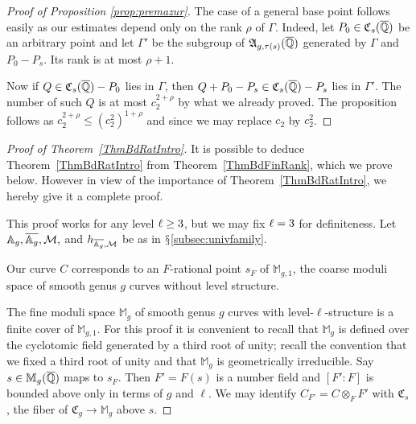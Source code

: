 \begin{proof}[Proof of Proposition \ref{prop:premazur}]
  The case of a general base point follows easily as our estimates
  depend only on the rank $\rho$ of $\Gamma$. Indeed,
  let $P_0\in \mathfrak{C}_s({\overline{\mathbb{Q}}})$ be an arbitrary point and let
  $\Gamma'$ be the subgroup of $\mathfrak{A}_{g,\tau(s)}({\overline{\mathbb{Q}}})$ generated by
  $\Gamma$ and $P_0-P_s$. Its rank is at most $\rho +1$.

  Now if $Q\in \mathfrak{C}_s({\overline{\mathbb{Q}}})-P_0$ lies in $\Gamma$, then
  $Q+P_0-P_s\in \mathfrak{C}_s({\overline{\mathbb{Q}}})-P_s$ lies in $\Gamma'$. The
  number of such $Q$ is at most $c_2^{2+\rho}$ by
  what we already proved. 
  The proposition follows as $c_2^{2+\rho}\le (c_2^2)^{1+\rho}$ and
  since we may replace $c_2$ by $c_2^2$. 
\end{proof}




\begin{proof}[Proof of Theorem~\ref{ThmBdRatIntro}] 
  It is possible to deduce Theorem~\ref{ThmBdRatIntro} from
  Theorem~\ref{ThmBdFinRank}, which we prove below. However in view of
  the importance of Theorem~\ref{ThmBdRatIntro}, we hereby give it a
  complete proof.

  This proof works for any level $\ell\ge3$, but we may fix
  $\ell=3$ for definiteness. Let
  $\mathbb{A}_g,\overline{\mathbb{A}_g},{\mathcal M},$
  and $h_{\overline{\mathbb{A}_g},{\mathcal M}}$ be as in $\mathsection$\ref{subsec:univfamily}.

  
  Our curve $C$ corresponds to an $F$-rational point $s_F$ of $\mathbb{M}_{g,1}$, the coarse
  moduli space of smooth genus $g$ curves without level structure. 

  
  The fine moduli space $\mathbb{M}_g$ of smooth genus $g$ curves
  with level-$\ell$-structure is a finite cover of $\mathbb{M}_{g,1}$.
  For this proof it is convenient to recall that 
  $\mathbb{M}_g$ is defined over
  the cyclotomic field generated by a third root of unity;
  recall the convention that we fixed a third root of unity and that
  $\mathbb{M}_g$ is geometrically irreducible.
  Say $s\in\mathbb{M}_g({\overline{\mathbb{Q}}})$ maps to $s_F$. Then
  $F'=F(s)$ is a number field and  
  $[F':F]$ is bounded above
  only in terms of $g$ and $\ell$. We may identify $C_{F'} = C\otimes_F F'$ with $\mathfrak{C}_s$, the 
  fiber of
  $\mathfrak{C}_g\rightarrow\mathbb{M}_g$ above $s$.


\end{proof}
